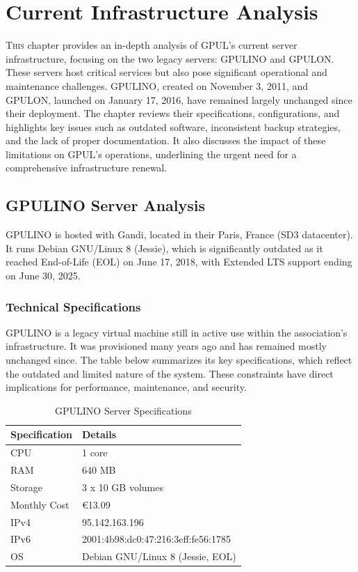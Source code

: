 %

\chapter{Current Infrastructure Analysis}
\label{chap:current-infrastructure}

\lettrine{T}{his} chapter provides an in-depth analysis of GPUL's current server infrastructure, focusing on the two legacy servers: GPULINO and GPULON. These servers host critical services but also pose significant operational and maintenance challenges. GPULINO, created on November 3, 2011, and GPULON, launched on January 17, 2016, have remained largely unchanged since their deployment. The chapter reviews their specifications, configurations, and highlights key issues such as outdated software, inconsistent backup strategies, and the lack of proper documentation. It also discusses the impact of these limitations on GPUL's operations, underlining the urgent need for a comprehensive infrastructure renewal.

\section{GPULINO Server Analysis}

GPULINO is hosted with Gandi, located in their Paris, France (SD3 datacenter). It runs Debian GNU/Linux 8 (Jessie), which is significantly outdated as it reached End-of-Life (EOL) on June 17, 2018, with Extended LTS support ending on June 30, 2025.

\subsection{Technical Specifications}

GPULINO is a legacy virtual machine still in active use within the association's infrastructure. It was provisioned many years ago and has remained mostly unchanged since. The table below summarizes its key specifications, which reflect the outdated and limited nature of the system. These constraints have direct implications for performance, maintenance, and security.

\begin{table}[H]
  \centering
  \caption{GPULINO Server Specifications}
  \label{tab:gpulino_specs}
  \begin{tabular}{ll}
    \rowcolor{udcpink!25}
    \textbf{Specification} & \textbf{Details} \\
    \hline
    CPU & 1 core \\
    RAM & 640 MB \\
    Storage & 3 x 10 GB volumes \\
    Monthly Cost & €13.09 \\
    IPv4 & 95.142.163.196 \\
    IPv6 & 2001:4b98:dc0:47:216:3eff:fe56:1785 \\
    OS & Debian GNU/Linux 8 (Jessie, EOL) \\
  \end{tabular}
\end{table}

